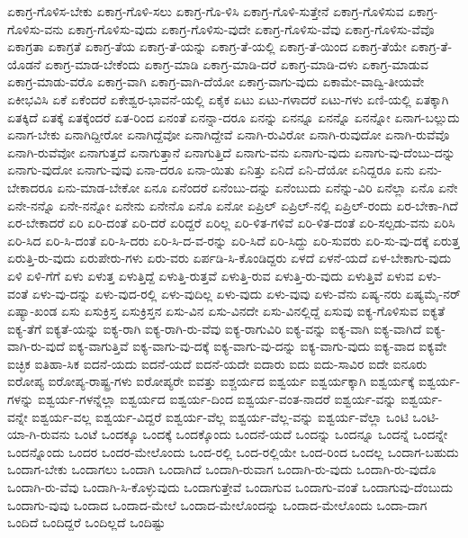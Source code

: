 {ಏಕಾಗ್ರ-ಗೊಳಿಸ-ಬೇಕು
ಏಕಾಗ್ರ-ಗೊಳಿ-ಸಲು
ಏಕಾಗ್ರ-ಗೊ-ಳಿಸಿ
ಏಕಾಗ್ರ-ಗೊಳಿ-ಸುತ್ತೇನೆ
ಏಕಾಗ್ರ-ಗೊಳಿಸುವ
ಏಕಾಗ್ರ-ಗೊಳಿಸು-ವನು
ಏಕಾಗ್ರ-ಗೊಳಿಸು-ವುದು
ಏಕಾಗ್ರ-ಗೊಳಿಸು-ವುದೇ
ಏಕಾಗ್ರ-ಗೊಳಿಸು-ವೆವು
ಏಕಾಗ್ರ-ಗೊಳಿಸು-ವೆವೊ
ಏಕಾಗ್ರತಾ
ಏಕಾಗ್ರತೆ
ಏಕಾಗ್ರ-ತೆಯ
ಏಕಾಗ್ರ-ತೆ-ಯನ್ನು
ಏಕಾಗ್ರ-ತೆ-ಯಲ್ಲಿ
ಏಕಾಗ್ರ-ತೆ-ಯಿಂದ
ಏಕಾಗ್ರ-ತೆಯೇ
ಏಕಾಗ್ರ-ತೆ-ಯೊಡನೆ
ಏಕಾಗ್ರ-ಮಾಡ-ಬೇಕೆಂದು
ಏಕಾಗ್ರ-ಮಾಡಿ
ಏಕಾಗ್ರ-ಮಾಡಿ-ದರೆ
ಏಕಾಗ್ರ-ಮಾಡಿ-ದಳು
ಏಕಾಗ್ರ-ಮಾಡುವ
ಏಕಾಗ್ರ-ಮಾಡು-ವರೊ
ಏಕಾಗ್ರ-ವಾಗಿ
ಏಕಾಗ್ರ-ವಾಗಿ-ದೆಯೋ
ಏಕಾಗ್ರ-ವಾಗು-ವುದು
ಏಕಾಮೇ-ವಾದ್ವಿ-ತೀಯವೇ
ಏಕೀಭವಿಸಿ
ಏಕೆ
ಏಕೆಂದರೆ
ಏಕೇಶ್ವರ-ಭಾವನೆ-ಯಲ್ಲಿ
ಏಕೈಕ
ಏಟು
ಏಟು-ಗಳಾದರೆ
ಏಟು-ಗಳು
ಏಣಿ-ಯಲ್ಲಿ
ಏತಕ್ಕಾಗಿ
ಏತಕ್ಕಿದೆ
ಏತಕ್ಕೆ
ಏತಕ್ಕೆಂದರೆ
ಏತ-ರಿಂದ
ಏನಂತೆ
ಏನನ್ನಾ-ದರೂ
ಏನನ್ನು
ಏನನ್ನೂ
ಏನನ್ನೊ
ಏನನ್ನೋ
ಏನಾಗ-ಬಲ್ಲುದು
ಏನಾಗ-ಬೇಕು
ಏನಾಗಿದ್ದೀರೋ
ಏನಾಗಿದ್ದೆವೋ
ಏನಾಗಿದ್ದೇವೆ
ಏನಾಗಿ-ರುವಿರೋ
ಏನಾಗಿ-ರುವುದೋ
ಏನಾಗಿ-ರುವೆವೊ
ಏನಾಗಿ-ರುವೆವೋ
ಏನಾಗುತ್ತದೆ
ಏನಾಗುತ್ತಾನೆ
ಏನಾಗುತ್ತಿದೆ
ಏನಾಗು-ವನು
ಏನಾಗು-ವುದು
ಏನಾಗು-ವು-ದೆಂಬು-ದನ್ನು
ಏನಾಗು-ವುದೋ
ಏನಾಗು-ವುವು
ಏನಾ-ದರೂ
ಏನಾ-ಯಿತು
ಏನಿತ್ತು
ಏನಿದೆ
ಏನಿ-ದೆಯೋ
ಏನಿದ್ದರೂ
ಏನು
ಏನು-ಬೇಕಾದರೂ
ಏನು-ಮಾಡ-ಬೇಕೋ
ಏನೂ
ಏನೆಂದರೆ
ಏನೆಂಬು-ದನ್ನು
ಏನೆಂಬುದು
ಏನೆನ್ನು-ವಿರಿ
ಏನೆಲ್ಲಾ
ಏನೊ
ಏನೇ
ಏನೇ-ನನ್ನೊ
ಏನೇ-ನನ್ನೋ
ಏನೇನು
ಏನೇನೊ
ಏನೊ
ಏನೋ
ಏಪ್ರಿಲ್
ಏಪ್ರಿಲ್-ನಲ್ಲಿ
ಏಪ್ರಿಲ್-ರಂದು
ಏರ-ಬೇಕಾ-ಗಿದೆ
ಏರ-ಬೇಕಾದರೆ
ಏರಿ
ಏರಿ-ದಂತೆ
ಏರಿ-ದರೆ
ಏರಿದ್ದರೆ
ಏರಿಲ್ಲ
ಏರಿ-ಳಿತ-ಗಳಿವೆ
ಏರಿ-ಳಿತ-ದಂತೆ
ಏರಿ-ಸಲ್ಪಡು-ವನು
ಏರಿಸಿ
ಏರಿ-ಸಿದ
ಏರಿ-ಸಿ-ದಂತೆ
ಏರಿ-ಸಿ-ದರು
ಏರಿ-ಸಿ-ದ-ವ-ರನ್ನು
ಏರಿ-ಸಿದೆ
ಏರಿ-ಸಿದ್ದು
ಏರಿ-ಸುವರು
ಏರಿ-ಸು-ವು-ದಕ್ಕೆ
ಏರುತ್ತ
ಏರುತ್ತಿ-ರು-ವುದು
ಏರುಪೇರು-ಗಳು
ಏರು-ವರು
ಏರ್ಪಡಿ-ಸಿ-ಕೊಂಡಿದ್ದರು
ಏಳದೆ
ಏಳನೆ-ಯದೆ
ಏಳ-ಬೇಕಾಗು-ವುದು
ಏಳಿ
ಏಳಿ-ಗೆಗೆ
ಏಳು
ಏಳುತ್ತ
ಏಳುತ್ತಿದ್ದೆ
ಏಳುತ್ತಿ-ರುತ್ತವೆ
ಏಳುತ್ತಿ-ರುವ
ಏಳುತ್ತಿ-ರು-ವುದು
ಏಳುತ್ತಿವೆ
ಏಳುವ
ಏಳು-ವಂತೆ
ಏಳು-ವು-ದನ್ನು
ಏಳು-ವುದ-ರಲ್ಲಿ
ಏಳು-ವುದಿಲ್ಲ
ಏಳು-ವುದು
ಏಳು-ವುವು
ಏಳು-ವೆನು
ಏಷ್ಯ-ನರು
ಏಷ್ಯಮೈ-ನರ್
ಏಷ್ಯಾ-ಖಂಡ
ಏಸು
ಏಸುಕ್ರಿಸ್ತ
ಏಸುಕ್ರಿಸ್ತನ
ಏಸು-ವಿನ
ಏಸು-ವಿನದೇ
ಏಸು-ವಿನಲ್ಲಿದ್ದೆ
ಏಸುವು
ಐಕ್ಯ-ಗೊಳಿಸುವ
ಐಕ್ಯತೆ
ಐಕ್ಯ-ತೆಗೆ
ಐಕ್ಯತೆ-ಯನ್ನು
ಐಕ್ಯ-ರಾಗಿ
ಐಕ್ಯ-ರಾಗಿ-ರು-ವೆವು
ಐಕ್ಯ-ರಾಗುವಿರಿ
ಐಕ್ಯ-ವನ್ನು
ಐಕ್ಯ-ವಾಗಿ
ಐಕ್ಯ-ವಾಗಿದೆ
ಐಕ್ಯ-ವಾಗಿ-ರು-ವುದೆ
ಐಕ್ಯ-ವಾಗುತ್ತಿವೆ
ಐಕ್ಯ-ವಾಗು-ವು-ದಕ್ಕೆ
ಐಕ್ಯ-ವಾಗು-ವು-ದನ್ನು
ಐಕ್ಯ-ವಾಗು-ವುದು
ಐಕ್ಯ-ವಾದ
ಐಕ್ಯವೇ
ಐಚ್ಛಿಕ
ಐತಿಹಾ-ಸಿಕ
ಐದನೆ-ಯದು
ಐದನೆ-ಯದೆ
ಐದನೆ-ಯದೇ
ಐದಾರು
ಐದು
ಐದು-ಸಾವಿರ
ಐದೇ
ಐನೂರು
ಐರೋಪ್ಯ
ಐರೋಪ್ಯ-ರಾಷ್ಟ್ರ-ಗಳು
ಐರೋಪ್ಯರೇ
ಐವತ್ತು
ಐಶ್ಚರ್ಯದ
ಐಶ್ವರ್ಯ
ಐಶ್ವರ್ಯಕ್ಕಾಗಿ
ಐಶ್ವರ್ಯಕ್ಕೆ
ಐಶ್ವರ್ಯ-ಗಳನ್ನು
ಐಶ್ವರ್ಯ-ಗಳನ್ನೆಲ್ಲಾ
ಐಶ್ವರ್ಯದ
ಐಶ್ವರ್ಯ-ದಿಂದ
ಐಶ್ವರ್ಯ-ವಂತ-ನಾದರೆ
ಐಶ್ವರ್ಯ-ವನ್ನು
ಐಶ್ವರ್ಯ-ವನ್ನೇ
ಐಶ್ವರ್ಯ-ವಲ್ಲ
ಐಶ್ವರ್ಯ-ವಿದ್ದರೆ
ಐಶ್ವರ್ಯ-ವೆಲ್ಲ
ಐಶ್ವರ್ಯ-ವೆಲ್ಲ-ವನ್ನು
ಐಶ್ವರ್ಯ-ವೆಲ್ಲಾ
ಒಂಟಿ
ಒಂಟಿ-ಯಾ-ಗಿ-ರುವನು
ಒಂಟೆ
ಒಂದಕ್ಕೂ
ಒಂದಕ್ಕೆ
ಒಂದಕ್ಕೊಂದು
ಒಂದನೆ-ಯದೆ
ಒಂದನ್ನು
ಒಂದನ್ನೂ
ಒಂದನ್ನೆ
ಒಂದನ್ನೇ
ಒಂದನ್ನೊಂದು
ಒಂದರ
ಒಂದರ-ಮೇಲೊಂದು
ಒಂದ-ರಲ್ಲಿ
ಒಂದ-ರಲ್ಲಿಯೇ
ಒಂದ-ರಿಂದ
ಒಂದಲ್ಲ
ಒಂದಾಗ-ಬಹುದು
ಒಂದಾಗ-ಬೇಕು
ಒಂದಾಗಲು
ಒಂದಾಗಿ
ಒಂದಾಗಿದೆ
ಒಂದಾಗಿ-ರುವಾಗ
ಒಂದಾಗಿ-ರು-ವುದು
ಒಂದಾಗಿ-ರು-ವುದೊ
ಒಂದಾಗಿ-ರು-ವೆವು
ಒಂದಾಗಿ-ಸಿ-ಕೊಳ್ಳುವುದು
ಒಂದಾಗುತ್ತೇವೆ
ಒಂದಾಗುವ
ಒಂದಾಗು-ವಂತೆ
ಒಂದಾಗುವು-ದೆಂಬುದು
ಒಂದಾಗು-ವುವು
ಒಂದಾದ
ಒಂದಾದ-ಮೇಲೆ
ಒಂದಾದ-ಮೇಲೊಂದನ್ನು
ಒಂದಾದ-ಮೇಲೊಂದು
ಒಂದಾ-ದಾಗ
ಒಂದಿದೆ
ಒಂದಿದ್ದರೆ
ಒಂದಿಲ್ಲದೆ
ಒಂದಿಷ್ಟು
}
